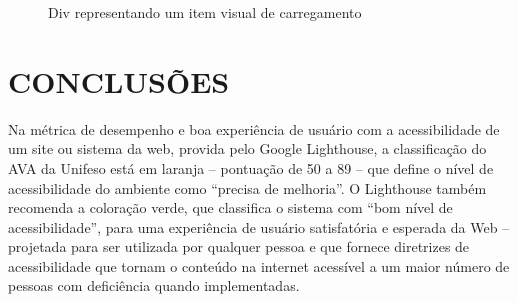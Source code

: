 \documentclass[
	12pt,				%
	openright,			%
	oneside,			%
	a4paper,			%
	chapter=TITLE,		%
	section=TITLE,		%
	subsection=TITLE,	%
	subsubsection=TITLE,%
	english,			%
	brazil				%
	]{abntex2}
\theoremstyle{definition}
\begin{document}
\begin{itemize}
\begin{figure}[!h]
\centering
\caption{Div representando um item visual de carregamento}
\label{Div representando um item visual de carregamento}
\end{figure}


\end{itemize}

\chapter{CONCLUSÕES}

Na métrica de desempenho e boa experiência de usuário com a acessibilidade de um site ou sistema da web, provida pelo Google Lighthouse, a classificação do AVA da Unifeso está em laranja – pontuação de 50 a 89 – que define o nível de acessibilidade do ambiente como “precisa de melhoria”. O Lighthouse também recomenda a coloração verde, que classifica o sistema com “bom nível de acessibilidade”, para uma experiência de usuário satisfatória e esperada da Web – projetada para ser utilizada por qualquer pessoa e que fornece diretrizes de acessibilidade que tornam o conteúdo na internet acessível a um maior número de pessoas com deficiência quando implementadas.
\end{document}
